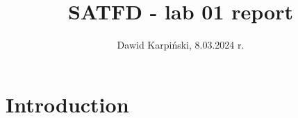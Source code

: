 \documentclass[13pt,a4paper]{article}
\begin{document}
\title{
    \LARGE
    \textbf{SATFD - lab 01 report}
}
\author{
    \large
    Dawid Karpiński, 8.03.2024 r.
}
\date{}
\maketitle

\section{Introduction}
\end{document}
